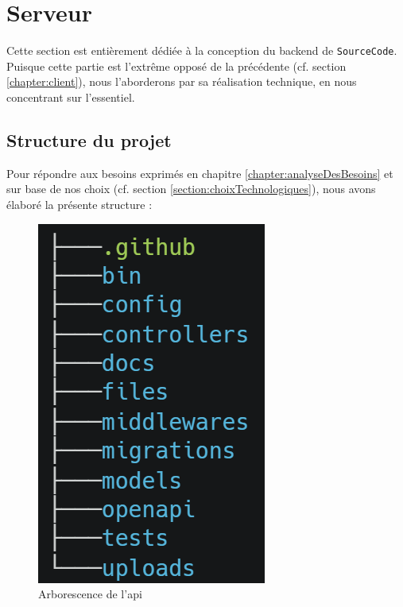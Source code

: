 \pagebreak
\section{Serveur}
\label{chapter:api}

Cette section est entièrement dédiée à la conception du \gls{backend} de \texttt{SourceCode}.
Puisque cette partie est l'extrême opposé de la précédente (cf. section \ref{chapter:client}), nous l'aborderons par sa réalisation technique, en nous concentrant sur l'essentiel.

\subsection{Structure du projet}

Pour répondre aux besoins exprimés en chapitre \ref{chapter:analyseDesBesoins} et sur base de nos choix (cf. section \ref{section:choixTechnologiques}), nous avons élaboré la présente structure :

\begin{figure}[H]
    \includegraphics[width=\textwidth,height=0.25\textheight,keepaspectratio]{images/serveur/tree_folders.png}
    \centering
    \caption[SourceCode : Arborescence de l'API]{Arborescence de l'\Gls{api}}
    \label{fig:arborenceAPI}
\end{figure}


